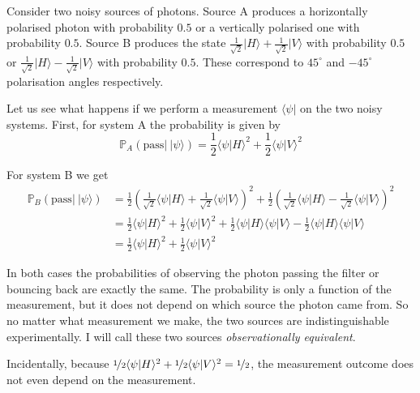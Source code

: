 \begin{example}
Consider two noisy sources of photons. Source A produces a horizontally polarised photon with probability $0.5$ or a vertically polarised one with probability $0.5$. Source B produces the state $\frac{1}{\sqrt{2}}\vert H \rangle + \frac{1}{\sqrt{2}} \vert V \rangle$ with probability $0.5$ or $\frac{1}{\sqrt{2}}\vert H \rangle - \frac{1}{\sqrt{2}} \vert V \rangle$ with probability $0.5$. These correspond to $45^{\circ}$ and $-45^{\circ}$ polarisation angles respectively.

Let us see what happens if we perform a measurement $\langle \psi \vert$ on the two noisy systems. First, for system A the probability is given by
\begin{equation}
\mathbb{P}_{A}\left( \mbox{pass} \vert\ \vert\psi\rangle \right) = \frac{1}{2} \langle\psi\vert H\rangle^2 + \frac{1}{2} \langle\psi\vert V\rangle^2
\end{equation}

For system B we get
\begin{align}
\mathbb{P}_{B}\left( \mbox{pass} \vert\ \vert\psi\rangle \right) &= \frac{1}{2} \left(\frac{1}{\sqrt{2}}\langle\psi\vert H\rangle + \frac{1}{\sqrt{2}}\langle\psi\vert V \rangle\right)^2 + \frac{1}{2} \left(\frac{1}{\sqrt{2}}\langle\psi\vert H\rangle - \frac{1}{\sqrt{2}}\langle\psi\vert V \rangle\right)^2 \\
	&= \frac{1}{2} \langle\psi\vert H\rangle^2 + \frac{1}{2} \langle\psi\vert V\rangle^2 + \frac{1}{2}\langle\psi\vert H\rangle\langle\psi\vert V\rangle - \frac{1}{2}\langle\psi\vert H\rangle\langle\psi\vert V\rangle \\
	&= \frac{1}{2} \langle\psi\vert H\rangle^2 + \frac{1}{2} \langle\psi\vert V\rangle^2
\end{align}

In both cases the probabilities of observing the photon passing the filter or bouncing back are exactly the same. The probability is only a function of the measurement, but it does not depend on which source the photon came from. So no matter what measurement we make, the two sources are indistinguishable experimentally. I will call these two sources \emph{observationally equivalent}.

Incidentally, because $\nicefrac{1}{2} \langle\psi\vert H\rangle^2 + \nicefrac{1}{2} \langle\psi\vert V\rangle^2 = \nicefrac{1}{2}$, the measurement outcome does not even depend on the measurement.
\label{empl:two_noisy_systems}
\end{example}


